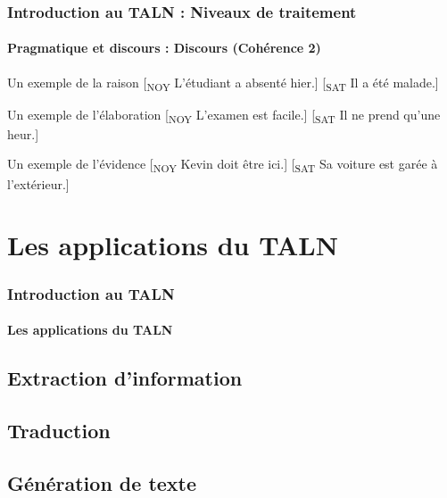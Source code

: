 \documentclass[xcolor=table]{beamer}
\begin{document}
\begin{frame}
\frametitle{Introduction au TALN : Niveaux de traitement}
\framesubtitle{Pragmatique et discours : Discours (Cohérence 2)}

\begin{exampleblock}{Un exemple de la raison}
	[\textsubscript{NOY} L'étudiant a absenté hier.] [\textsubscript{SAT} Il a été malade.]
\end{exampleblock}

\begin{exampleblock}{Un exemple de l'élaboration}
	[\textsubscript{NOY} L'examen est facile.] [\textsubscript{SAT} Il ne prend qu'une heur.]
\end{exampleblock}

\begin{exampleblock}{Un exemple de l'évidence}
	[\textsubscript{NOY} Kevin doit être ici.] [\textsubscript{SAT} Sa voiture est garée à l'extérieur.]
\end{exampleblock}


\end{frame}

\section{Les applications du TALN}

\begin{frame}
\frametitle{Introduction au TALN}
\framesubtitle{Les applications du TALN}

\end{frame}

\subsection{Extraction d'information}

\subsection{Traduction}

\subsection{Génération de texte}

\end{document}
